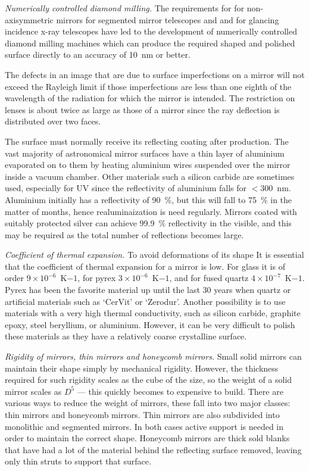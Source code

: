\documentclass{article}
\begin{document}
\noindent
{\it Numerically controlled diamond milling.} The requirements for for non-axisymmetric
mirrors for segmented mirror telescopes and and for glancing incidence x-ray telescopes
have led to the development of numerically controlled diamond milling machines which 
can produce the required shaped and polished surface directly to an accuracy of 10~nm or
better.

The defects in an image that are due to surface imperfections on a mirror will
not exceed the Rayleigh limit if those imperfections are less than 
one eighth of the wavelength of the radiation for which the mirror is intended.
The restriction on lenses is about twice as large as those of a mirror
since the ray deflection is distributed over two faces. 

The surface must normally receive its reflecting coating after production. The
vast majority of astronomical mirror surfaces have a thin layer of aluminium
evaporated on to them by heating aluminium wires suspended over the mirror 
inside a vacuum chamber. Other materials such a silicon carbide are sometimes
used, especially for UV since the reflectivity of aluminium falls for 
$<300$~nm. Aluminium initially has a reflectivity of 90~\%, but this will
fall to 75~\% in the matter of months, hence realuminaization is need 
regularly. Mirrors coated with suitably protected silver can achieve 99.9~\%
reflectivity in the visible, and this may be required as the total number of
reflections becomes large.

\noindent
{\it Coefficient of thermal expansion.} To avoid deformations of its shape It is essential
that the coefficient of thermal expansion for a mirror is low. For glass it is of order
$9\times 10^{-6}$~K${-1}$, for pyrex $3\times 10^{-6}$~K${-1}$, and for fused quartz
$4\times 10^{-7}$~K${-1}$. Pyrex has been the favorite material up until the last 30 years
when quartz or artificial materials such as `CerVit' or `Zerodur'. Another possibility is to 
use materials with a very high thermal conductivity, such as silicon carbide, graphite epoxy,
steel beryllium, or aluminium. However, it can be very difficult to polish these materials as
they have a relatively coarse crystalline surface.

\noindent
{\it Rigidity of mirrors, thin mirrors and honeycomb mirrors.} Small solid mirrors can maintain
their shape simply by mechanical rigidity. However, the thickness required for such rigidity
scales as the cube of the size, so the weight of a solid mirror scales as $D^5$ --- this quickly 
becomes to expensive to build. There are various ways to reduce the weight of mirrors, these
fall into two major classes: thin mirrors and honeycomb mirrors. Thin mirrors are also subdivided
into monolithic and segmented mirrors. In both cases active support is needed in order to 
maintain the correct shape. Honeycomb mirrors are thick sold blanks that have had a lot of
the material behind the reflecting surface removed, leaving only thin struts to support that surface. 
\end{document}
